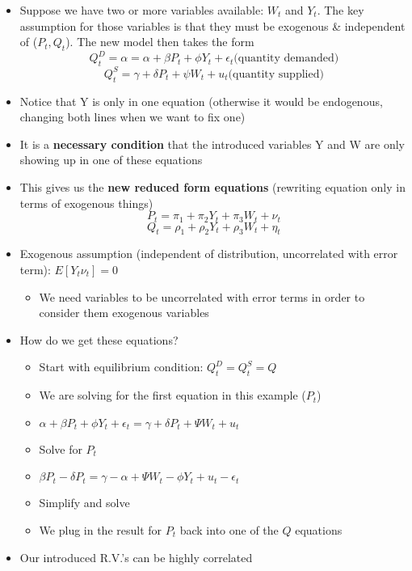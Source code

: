 \documentclass[10pt, oneside]{article}
\begin{document}
\begin{itemize}
    \item Suppose we have two or more variables available: $W_t$ and $Y_t$. The key assumption for those variables is that they must be exogenous \& independent of ($P_t, Q_t$). The new model then takes the form \[Q_t^D = \alpha = \alpha + \beta P_t + \phi Y_t + \epsilon_t \text{(quantity demanded)}\]\[Q_t^S = \gamma + \delta P_t + \psi W_t + u_t \text{(quantity supplied)}\]
    \item Notice that Y is only in one equation (otherwise it would be endogenous, changing both lines when we want to fix one)
    \item It is a \textbf{necessary condition} that the introduced variables Y and W are only showing up in one of these equations
    \item This gives us the \textbf{new reduced form equations} (rewriting equation only in terms of exogenous things)
    \[P_t = \pi_1 + \pi_2 Y_t + \pi_3 W_t + \nu_t\]
    \[Q_t = \rho_1 + \rho_2 Y_t + \rho_3 W_t + \eta_t\]
    \item Exogenous assumption (independent of distribution, uncorrelated with error term): $E[Y_t \nu_t] = 0$
    \begin{itemize}
        \item We need variables to be uncorrelated with error terms in order to consider them exogenous variables
    \end{itemize}
    \item How do we get these equations?
    \begin{itemize}
        \item Start with equilibrium condition: $Q_t ^D = Q_t ^S = Q$
        \item We are solving for the first equation in this example ($P_t$)
        \item $\alpha + \beta P_t + \phi Y_t + \epsilon_t = \gamma + \delta P_t + \Psi W_t + u_t$
        \item Solve for $P_t$
        \item $\beta P_t - \delta P_t = \gamma - \alpha + \Psi W_t - \phi Y_t + u_t - \epsilon_t$
        \item Simplify and solve
        \item We plug in the result for $P_t$ back into one of the $Q$ equations
    \end{itemize}
    \item Our introduced R.V.'s can be highly correlated
    \begin{itemize}

\end{itemize}
\end{itemize}
\end{document}
